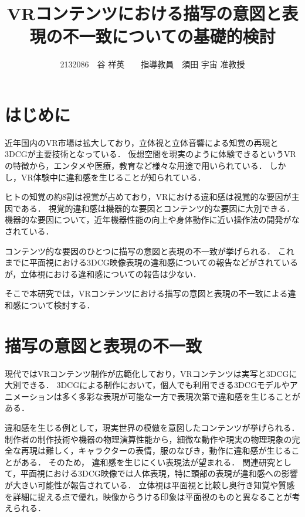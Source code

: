 \documentclass[twocolumn,10pt,a4j]{ltjsarticle}
\title{VRコンテンツにおける描写の意図と表現の不一致についての基礎的検討}
\author{2132086　谷 祥英　　指導教員　須田 宇宙 准教授}
\date{}
\begin{document}
\maketitle

\section{はじめに}

近年国内のVR市場は拡大しており，立体視と立体音響による知覚の再現と3DCGが主要技術となっている．
仮想空間を現実のように体験できるというVRの特徴から，エンタメや医療，教育など様々な用途で用いられている．
しかし，VR体験中に違和感を生じることが知られている．

ヒトの知覚の約8割は視覚が占めており，VRにおける違和感は視覚的な要因が主因である．
視覚的違和感は機器的な要因とコンテンツ的な要因に大別できる．
機器的な要因について，近年機器性能の向上や身体動作に近い操作法の開発がなされている．

コンテンツ的な要因のひとつに描写の意図と表現の不一致が挙げられる．
これまでに平面視における3DCG映像表現の違和感についての報告などがされているが，立体視における違和感についての報告は少ない．


そこで本研究では，VRコンテンツにおける描写の意図と表現の不一致による違和感について検討する．

\section{描写の意図と表現の不一致}
現代ではVRコンテンツ制作が広範化しており，VRコンテンツは実写と3DCGに大別できる．
3DCGによる制作において，個人でも利用できる3DCGモデルやアニメーションは多く多彩な表現が可能な一方で表現次第で違和感を生じることがある．

違和感を生じる例として，現実世界の模倣を意図したコンテンツが挙げられる．
制作者の制作技術や機器の物理演算性能から，細微な動作や現実の物理現象の完全な再現は難しく，キャラクターの表情，服のなびき，動作に違和感が生じることがある．
そのため，%
違和感を生じにくい表現法が望まれる．
関連研究として，平面視における3DCG映像では人体表現，特に頭部の表現が違和感への影響が大きい可能性が報告されている\cite{previous1}．
立体視は平面視と比較し奥行き知覚や質感を詳細に捉える点で優れ，映像からうける印象は平面視のものと異なることが考えられる．
\end{document}
